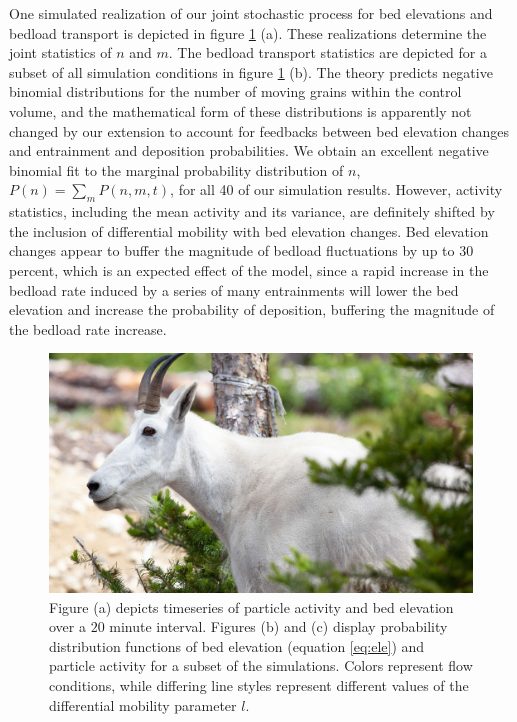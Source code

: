\documentclass[draft]{agujournal2018}
\begin{document}
One simulated realization of our joint stochastic process for bed elevations and bedload transport is depicted in figure \ref{fig:pdfs} (a). 
These realizations determine the joint statistics of $n$ and $m$. 
The bedload transport statistics are depicted for a subset of all simulation conditions in figure \ref{fig:pdfs} (b). 
The \citet{Ancey2008} theory predicts negative binomial distributions for the number of moving grains within the control volume, and the mathematical form of these distributions is apparently not changed by our extension to account for feedbacks between bed elevation changes and entrainment and deposition probabilities.
We obtain an excellent negative binomial fit to the marginal probability distribution of $n$, $P(n) = \sum_m P(n,m,t)$, for all 40 of our simulation results.
However, activity statistics, including the mean activity and its variance, are definitely shifted by the inclusion of differential mobility with bed elevation changes.
Bed elevation changes appear to buffer the magnitude of bedload fluctuations by up to 30 percent, which is an expected effect of the model, since a rapid increase in the bedload rate induced by a series of many entrainments will lower the bed elevation and increase the probability of deposition, buffering the magnitude of the bedload rate increase.

\begin{figure}[t!]
  \includegraphics[width=\linewidth,keepaspectratio]{rectdummy}
  \caption{Figure (a) depicts timeseries of particle activity and bed elevation over a $20$ minute interval. Figures (b) and (c) display probability distribution functions of bed elevation (equation \ref{eq:ele}) and particle activity for a subset of the simulations. Colors represent flow conditions, while differing line styles represent different values of the differential mobility parameter $l$.}
\vspace{-1.0cm}
  \label{fig:pdfs}
\end{figure}
\end{document}

